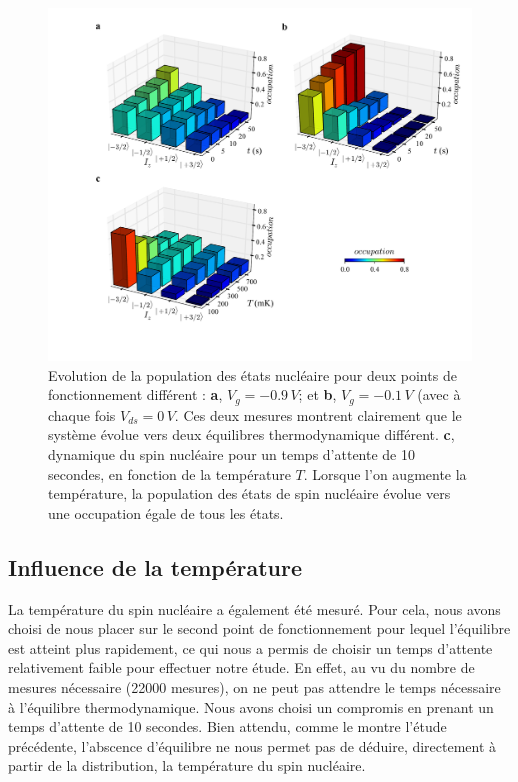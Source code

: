 \begin{figure}
\includegraphics[scale=0.45]{Resultats/Chap2/Figure5/figure5.pdf} 
\caption{Evolution de la population des états nucléaire pour deux points de fonctionnement différent : \textbf{a}, $V_g = -0.9\,V$; et \textbf{b}, $V_g = -0.1\,V$ (avec à chaque fois $V_{ds} = 0\,V$. Ces deux mesures montrent clairement que le système évolue vers deux équilibres thermodynamique différent. \textbf{c}, dynamique du spin nucléaire pour un temps d'attente de 10 secondes, en fonction de la température $T$. Lorsque l'on augmente la température, la population des états de spin nucléaire évolue vers une occupation égale de tous les états.}
\label{dynamique_spin}
\end{figure}

\subsection{Influence de la température}

La température du spin nucléaire a également été mesuré. Pour cela, nous avons choisi de nous placer sur le second point de fonctionnement pour lequel l'équilibre est atteint plus rapidement, ce qui nous  a permis de choisir un temps d'attente relativement faible pour effectuer notre étude. En effet, au vu du nombre de mesures nécessaire (22000 mesures), on ne peut pas attendre le temps nécessaire à l'équilibre thermodynamique. Nous avons choisi un compromis en prenant un temps d'attente de 10 secondes. Bien attendu, comme le montre l'étude précédente, l'abscence d'équilibre ne nous permet pas de déduire, directement à partir de la distribution, la température du spin nucléaire.

